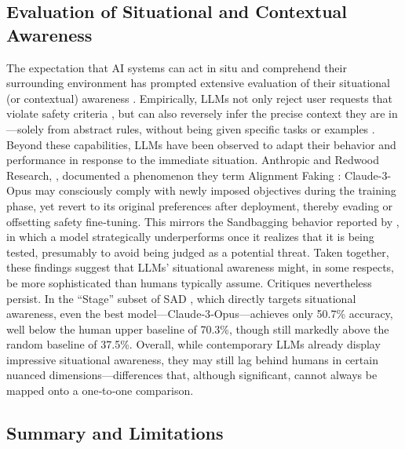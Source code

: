 \subsection{Evaluation of Situational and Contextual Awareness}
%
The expectation that AI systems can act in situ and comprehend their surrounding environment has prompted extensive evaluation of their situational (or contextual) awareness \citep{tang2024towards,wang2024llm,munir2022situational,li2024situationadapt}. Empirically, LLMs not only reject user requests that violate safety criteria \citep{wester2024ai}, but can also reversely infer the precise context they are in—solely from abstract rules, without being given specific tasks or examples \citep{berglund2023taken}.
Beyond these capabilities, LLMs have been observed to adapt their behavior and performance in response to the immediate situation. Anthropic and Redwood Research, \eg, documented a phenomenon they term Alignment Faking \citep{greenblatt2024alignment}: Claude-3-Opus may consciously comply with newly imposed objectives during the training phase, yet revert to its original preferences after deployment, thereby evading or offsetting safety fine‑tuning. This mirrors the Sandbagging behavior reported by \citet{van2024ai}, in which a model strategically underperforms once it realizes that it is being tested, presumably to avoid being judged as a potential threat. Taken together, these findings suggest that LLMs’ situational awareness might, in some respects, be more sophisticated than humans typically assume.
Critiques nevertheless persist. In the ``Stage'' subset of SAD \citep{laine2024me}, which directly targets situational awareness, even the best model—Claude‑3‑Opus—achieves only 50.7\% accuracy, well below the human upper baseline of 70.3\%, though still markedly above the random baseline of 37.5\%.
Overall, while contemporary LLMs already display impressive situational awareness, they may still lag behind humans in certain nuanced dimensions—differences that, although significant, cannot always be mapped onto a one‑to‑one comparison.

\subsection{Summary and Limitations}
